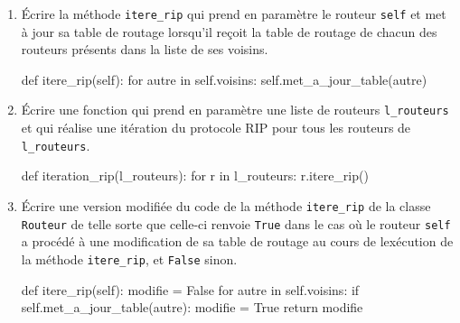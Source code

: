 \begin{enumerate}[series=monDS, resume]
    \begin{blocvisible}[height=4.5]
    \begin{CodePythontexAlt}[TaillePolice=\large, Largeur=1\linewidth,Centre,Lignes=true,PremLigne=1]{}
def met_a_jour_table(self, autre):
    for r in autre.nb_sauts: 
        if r != self: 
            if (r not in self.nb_sauts or self.nb_sauts[r] > \
                                        autre.nb_sauts[r] + 1): 
                self.nb_sauts[r] = autre.nb_sauts[r] + 1 
                self.prochain[r] = autre.nom
\end{CodePythontexAlt}
\end{blocvisible}

\medskip
    \item Écrire la méthode \verb|itere_rip| qui prend en paramètre le routeur \verb|self| et met à jour sa table de routage lorsqu’il reçoit la table de routage de chacun des routeurs présents dans la liste de ses voisins.
\begin{blocvisible}[height=2.5]
    \begin{CodePythontexAlt}[TaillePolice=\large, Largeur=1\linewidth,Centre,Lignes=true,PremLigne=1]{} 
def itere_rip(self): 
    for autre in self.voisins: 
        self.met_a_jour_table(autre)
\end{CodePythontexAlt}
    
\end{blocvisible}
    \medskip
    \item Écrire une fonction qui prend en paramètre une liste de routeurs \verb|l_routeurs| et qui réalise une itération du protocole RIP pour tous les routeurs de \verb|l_routeurs|.
\begin{blocvisible}[height=2.5]
    \begin{CodePythontexAlt}[TaillePolice=\large, Largeur=1\linewidth,Centre,Lignes=true,PremLigne=1]{} 
def iteration_rip(l_routeurs):
    for r in l_routeurs:
        r.itere_rip()
\end{CodePythontexAlt}
    
\end{blocvisible}

    \item Écrire une version modifiée du code de la méthode \verb|itere_rip| de la classe \verb|Routeur| de telle sorte que celle-ci renvoie \verb|True| dans le cas où le routeur \verb|self| a procédé à une modification de sa table de routage au cours de lexécution de la méthode \verb|itere_rip|, et \verb|False| sinon.

\begin{blocvisible}[height=4.]
    \begin{CodePythontexAlt}[TaillePolice=\large, Largeur=1\linewidth,Centre,Lignes=true,PremLigne=1]{}
def itere_rip(self): 
    modifie = False
    for autre in self.voisins: 
        if self.met_a_jour_table(autre):
            modifie = True
    return modifie
\end{CodePythontexAlt}
\end{blocvisible}


\end{enumerate}
